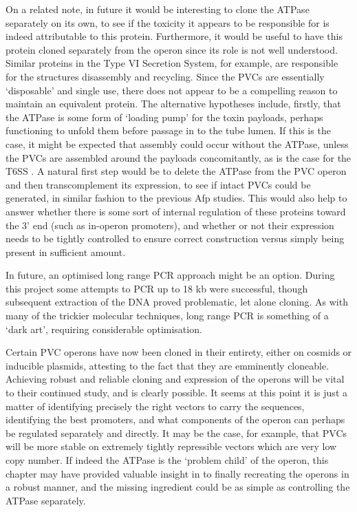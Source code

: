 On a related note, in future it would be interesting to clone the ATPase separately on its own, to see if the toxicity it appears to be responsible for is indeed attributable to this protein. Furthermore, it would be useful to have this protein cloned separately from the operon since its role is not well understood. Similar proteins in the Type VI Secretion System, for example, are responsible for the structures disassembly and recycling. Since the PVCs are essentially `disposable' and single use, there does not appear to be a compelling reason to maintain an equivalent protein. The alternative hypotheses include, firstly, that the ATPase is some form of `loading pump' for the toxin payloads, perhaps functioning to unfold them before passage in to the tube lumen. If this is the case, it might be expected that assembly could occur without the ATPase, unless the PVCs are assembled around the payloads concomitantly, as is the case for the T6SS \citep{Basler2015a}. A natural first step would be to delete the ATPase from the PVC operon and then transcomplement its expression, to see if intact PVCs could be generated, in similar fashion to the previous Afp studies. This would also help to answer whether there is some sort of internal regulation of these proteins toward the 3' end (such as in-operon promoters), and whether or not their expression needs to be tightly controlled to ensure correct construction versus simply being present in sufficient amount.

In future, an optimised long range PCR approach might be an option. During this project some attempts to PCR up to 18 kb were successful, though subsequent extraction of the DNA proved problematic, let alone cloning. As with many of the trickier molecular techniques, long range PCR is something of a `dark art', requiring considerable optimisation.

Certain PVC operons have now been cloned in their entirety, either on cosmids or inducible plasmids, attesting to the fact that they are emminently cloneable. Achieving robust and reliable cloning and expression of the operons will be vital to their continued study, and is clearly possible. It seems at this point it is just a matter of identifying precisely the right vectors to carry the sequences, identifying the best promoters, and what components of the operon can perhaps be regulated separately and directly. It may be the case, for example, that PVCs will be more stable on extremely tightly repressible vectors which are very low copy number. If indeed the ATPase is the `problem child' of the operon, this chapter may have provided valuable insight in to finally recreating the operons in a robust manner, and the missing ingredient could be as simple as controlling the ATPase separately.

